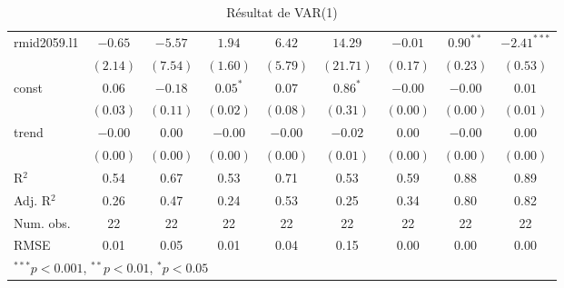 \documentclass[11pt,]{article}
\begin{document}
\begin{table}[!htbp]
\begin{center}
\begin{tabular}{l c c c c c c c c }
rmid2059.l1 & $-0.65$  & $-5.57$     & $1.94$     & $6.42$     & $14.29$     & $-0.01$  & $0.90^{**}$ & $-2.41^{***}$ \\
            & $(2.14)$ & $(7.54)$    & $(1.60)$   & $(5.79)$   & $(21.71)$   & $(0.17)$ & $(0.23)$    & $(0.53)$      \\
const       & $0.06$   & $-0.18$     & $0.05^{*}$ & $0.07$     & $0.86^{*}$  & $-0.00$  & $-0.00$     & $0.01$        \\
            & $(0.03)$ & $(0.11)$    & $(0.02)$   & $(0.08)$   & $(0.31)$    & $(0.00)$ & $(0.00)$    & $(0.01)$      \\
trend       & $-0.00$  & $0.00$      & $-0.00$    & $-0.00$    & $-0.02$     & $0.00$   & $-0.00$     & $0.00$        \\
            & $(0.00)$ & $(0.00)$    & $(0.00)$   & $(0.00)$   & $(0.01)$    & $(0.00)$ & $(0.00)$    & $(0.00)$      \\
\hline
R$^2$       & 0.54     & 0.67        & 0.53       & 0.71       & 0.53        & 0.59     & 0.88        & 0.89          \\
Adj. R$^2$  & 0.26     & 0.47        & 0.24       & 0.53       & 0.25        & 0.34     & 0.80        & 0.82          \\
Num. obs.   & 22       & 22          & 22         & 22         & 22          & 22       & 22          & 22            \\
RMSE        & 0.01     & 0.05        & 0.01       & 0.04       & 0.15        & 0.00     & 0.00        & 0.00          \\
\hline
\multicolumn{9}{l}{\scriptsize{$^{***}p<0.001$, $^{**}p<0.01$, $^*p<0.05$}}
\end{tabular}
\caption{Résultat de VAR(1)}
\label{table:coefficients}
\end{center}
\end{table}

\FloatBarrier

\FloatBarrier
\end{document}

